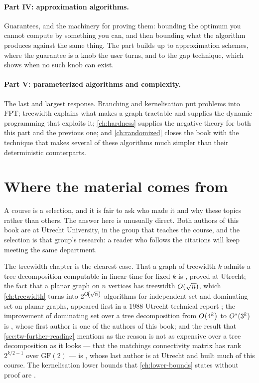 \paragraph{Part IV: approximation algorithms.}
Guarantees, and the machinery for proving them: bounding the optimum you cannot
compute by something you can, and then bounding what the algorithm produces
against the same thing. The part builds up to approximation schemes, where the
guarantee is a knob the user turns, and to the gap technique, which shows when
no such knob can exist.

\paragraph{Part V: parameterized algorithms and complexity.}
The last and largest response. Branching and kernelisation put problems into
$\mathrm{FPT}$; treewidth explains what makes a graph tractable and supplies the
dynamic programming that exploits it; \cref{ch:hardness} supplies the negative
theory for both this part and the previous one; and \cref{ch:randomized} closes
the book with the technique that makes several of these algorithms much
simpler than their deterministic counterparts.

\section{Where the material comes from}
\label{sec:intro-research}

A course is a selection, and it is fair to ask who made it and why these topics
rather than others. The answer here is unusually direct. Both authors of this
book are at Utrecht University, in the group that teaches the course, and the
selection is that group's research: a reader who follows the citations will
keep meeting the same department.

The treewidth chapter is the clearest case. That a graph of treewidth $k$ admits
a tree decomposition computable in linear time for fixed $k$ is
\citet{Bodlaender1996}, proved at Utrecht; the fact that a planar graph
on $n$ vertices has treewidth $O\!\left(\sqrt n\right)$, which \cref{ch:treewidth}
turns into $2^{O\!\left(\sqrt n\right)}$ algorithms for independent set and dominating
set on planar graphs, appeared first in a 1988 Utrecht technical report
\citep{Bodlaender1988}; the
improvement of dominating set over a tree decomposition from $O\!\left(4^k\right)$ to
$O^{*}(3^k)$ is \citet{VanRooijBodlaenderRossmanith2009}, whose first author
is one of the authors of this book; and the result that
\cref{sec:tw-further-reading} mentions as the reason 
is not as expensive over a tree decomposition as it looks ---
that the matchings connectivity matrix has rank $2^{k/2-1}$ over
$\mathrm{GF}(2)$ --- is \citet{CyganKratschNederlof2018}, whose last author is
at Utrecht and built much of this course. The kernelisation lower bounds that
\cref{ch:lower-bounds} states without proof are
\citet{BodlaenderDowneyFellowsHermelin2009}.

